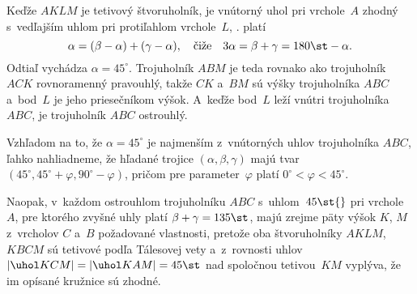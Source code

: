 {Keďže $AKLM$ je tetivový štvoruholník, je vnútorný uhol pri vrchole~$A$ zhodný
s~vedľajším uhlom pri protiľahlom vrchole~$L$, \tj. platí
$$
\alpha=(\beta-\alpha)+(\gamma-\alpha),
\quad\text{čiže}\quad
3\alpha=\beta+\gamma=180\st-\alpha.
$$
Odtiaľ vychádza $\alpha=45^{\circ}$. Trojuholník $ABM$ je teda rovnako ako trojuholník $ACK$
rovnoramenný pravouhlý, takže $CK$ a~$BM$ sú výšky trojuholníka $ABC$ a~bod~$L$ je jeho
priesečníkom výšok. A~keďže bod~$L$ leží vnútri trojuholníka $ABC$, je trojuholník $ABC$ ostrouhlý.

Vzhľadom na to, že $\alpha=45^{\circ}$ je najmenším z~vnútorných uhlov
trojuholníka $ABC$, ľahko nahliadneme, že hľadané trojice
$(\alpha,\beta,\gamma)$ majú tvar
$(45^{\circ},45^{\circ}+\varphi,90^{\circ}-\varphi)$,
pričom pre parameter~$\varphi$ platí $0^{\circ}<\varphi<45^{\circ}$.

Naopak, v~každom ostrouhlom trojuholníku $ABC$ s~uhlom~$45\st{}$ pri vrchole~$A$, pre ktorého
zvyšné uhly platí $\beta+\gamma=135\st$, majú zrejme päty výšok $K$, $M$ z~vrcholov $C$ a~$B$
požadované vlastnosti, pretože oba štvoruholníky $AKLM$, $KBCM$ sú tetivové
podľa Tálesovej vety a~z~rovnosti uhlov $|\uhol KCM|=|\uhol KAM|=45\st$ nad spoločnou
tetivou~$KM$ vyplýva, že im opísané kružnice sú zhodné.
\fi
}

